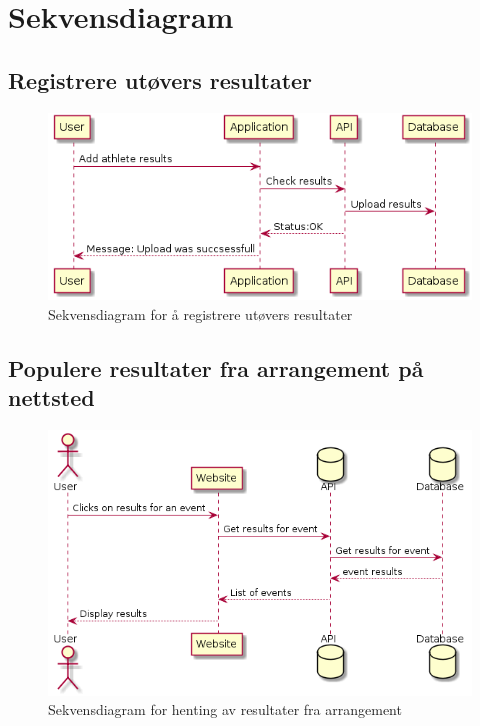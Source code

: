 \documentclass[norsk]{article}
\begin{document}
\section{Sekvensdiagram}
\subsection{Registrere utøvers resultater}

\begin{figure}[ht]
\centering 
    \includegraphics[scale=0.6]{images/add-athlete-results}
    \caption{Sekvensdiagram for å registrere utøvers resultater}\label{fig:add-at-res}
\end{figure}
\subsection{Populere resultater fra arrangement på nettsted}
\begin{figure}[ht]
\centering 
    \includegraphics[scale=0.5]{images/get-athletes}
    \caption{Sekvensdiagram for henting av resultater fra arrangement}\label{fig:get-at-res}
\end{figure}
\end{document}
